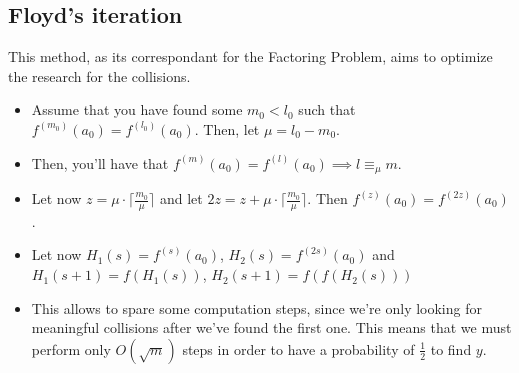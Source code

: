 \subsection{Floyd's iteration}
This method, as its correspondant for the Factoring Problem, aims to optimize the research for the collisions.
\begin{itemize}
    \item Assume that you have found some $m_0 < l_0$ such that $f^{(m_0)}(a_0) = f^{(l_0)}(a_0)$. Then, let $\mu = l_0 - m_0$.
    \item Then, you'll have that $f^{(m)}(a_0) = f^{(l)}(a_0) \implies l \equiv_{\mu} m$.
    \item Let now $z = \mu \cdot \lceil \frac{m_0}{\mu} \rceil$ and let $2z = z + \mu \cdot \lceil \frac{m_0}{\mu} \rceil$. Then $f^{(z)}(a_0) = f^{(2z)}(a_0)$.
    \item Let now $H_{1}(s) = f^{(s)}(a_0)$, $H_{2}(s) = f^{(2s)}(a_0)$ and
    $H_{1}(s + 1) = f(H_{1}(s))$, $H_{2}(s + 1) = f(f(H_{2}(s)))$
    \item This allows to spare some computation steps, since we're only looking for meaningful collisions after we've found the first one. This means that we must perform only $O(\sqrt{m})$ steps in order to have a probability of $\frac{1}{2}$ to find $y$.
\end{itemize}

